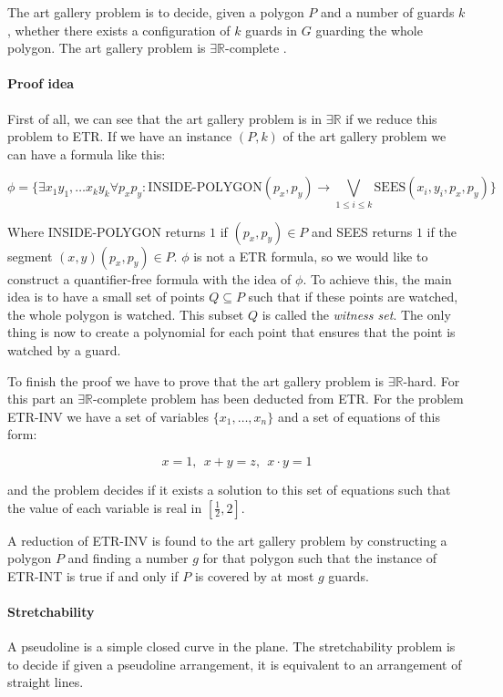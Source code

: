The art gallery problem is to decide, given a polygon $P$ and a number of
guards $k$, whether there exists a configuration of $k$ guards in $G$
guarding the whole polygon. The art gallery problem is $\exists
\mathbb{R}$-complete \cite{abrahamsenArtGalleryProblem2017}.

\paragraph{Proof idea} First of all, we can see that the art gallery problem
is in $\exists \mathbb{R}$ if we reduce this problem to ETR. If we have an
instance $(P,k)$ of the art gallery problem we can have a formula
\cite{EFRAT2006238} like this:

$$\phi = \{\exists x_1y_1,\dots x_ky_k \forall p_xp_y :
\text{INSIDE-POLYGON}(p_x,p_y) \to \bigvee_{1 \leq i \leq k}
\text{SEES}(x_i,y_i,p_x,p_y)\}$$

Where INSIDE-POLYGON returns $1$ if $(p_x,p_y) \in P$ and SEES returns $1$ if
the segment $(x,y)(p_x,p_y) \in P$. $\phi$ is not a ETR formula, so we would like
to construct a quantifier-free formula with the idea of $\phi$. To achieve this,
the main idea is to have a small set of points $Q \subseteq P$ such that if these
points are watched, the whole polygon is watched. This subset $Q$ is called
the \textit{witness set}. The only thing is now to create a polynomial for each
point that ensures that the point is watched by a guard.

To finish the proof we have to prove that the art gallery problem is $\exists
\mathbb{R}$-hard. For this part an $\exists \mathbb{R}$-complete
problem has been deducted from ETR. For the problem ETR-INV we have a set of
variables $\{x_1,\dots,x_n\}$ and a set of equations of this form:

$$x = 1,\ \ x + y = z,\ \ x \cdot y = 1 $$

and the problem decides if it exists a solution to this set of equations such
that the value of each variable is real in $[\frac{1}{2},2]$.

A reduction of ETR-INV is found to the art gallery problem by constructing
a polygon $P$ and finding a number $g$ for that polygon such that the instance
of ETR-INT is true if and only if $P$ is covered by at most $g$ guards.

\paragraph{Stretchability} A pseudoline is a simple closed curve in the plane.
The stretchability problem is to decide if given a pseudoline arrangement,
it is equivalent to an arrangement of straight lines.


